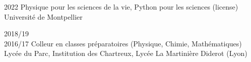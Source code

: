 \documentclass[letterpaper]{cvtemplate_fr} %
\begin{document}
\begin{cvbody}

\cvitem
	{2022}
	{}
	{Physique pour les sciences de la vie, Python pour les sciences (license)}
	{Université de Montpellier }
	{}{}{}
	{}
	{}

\cvitem
	{2018/19\\ \mbox{}\hfill 2016/17}
	{}
	{Colleur en classes pr\'eparatoires (Physique, Chimie, Mathématiques)}
	{Lyc\'ee du Parc, Institution des Chartreux, Lyc\'ee La Martinière Diderot (Lyon) }
	{}{}{}
	{}
	{
	}



\end{cvbody}
\end{document}

